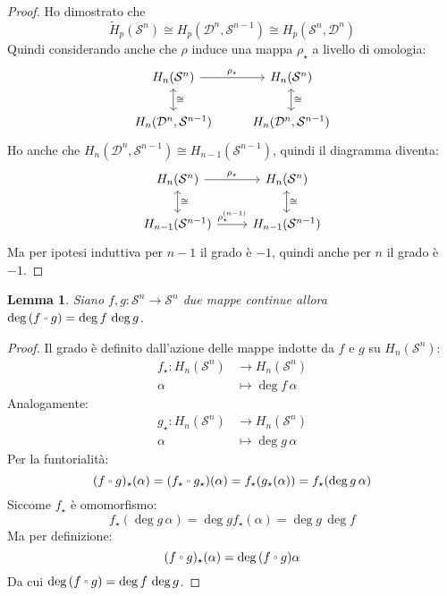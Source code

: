 \documentclass[10pt]{scrartcl}
\newcounter{lemmac}
\newtheorem{lemma}[lemmac]{Lemma}
\newcommand{\Sph}[1][]{\mathcal{S}^#1}
\newcommand{\Disk}[1][]{\mathcal{D}^#1}
\let\latexcirc=\circ
\newcommand{\ccirc}{\mathbin{\mathchoice
  {\xcirc\scriptstyle}
  {\xcirc\scriptstyle}
  {\xcirc\scriptscriptstyle}
  {\xcirc\scriptscriptstyle}
}}
\newcommand{\xcirc}[1]{\vcenter{\hbox{$#1\latexcirc$}}}
\let\circ\ccirc
\begin{document}
\begin{proof}
  Ho dimostrato che
  \[
    \tilde{H}_p(\Sph{n}) \cong H_p(\Disk{n}, \Sph{n-1}) \cong H_p(\Sph{n}, \Disk{n})
  \]
  Quindi considerando anche che $ \rho $ induce una mappa $ \rho_\star $ a livello di omologia:
  \[
    \begin{tikzcd}
      H_n(\Sph{n}) \rar{\rho_\star} \arrow[leftrightarrow]{d}{\cong} & H_n(\Sph{n})  \arrow[leftrightarrow]{d}{\cong} \\
      H_n(\Disk{n}, \Sph{n-1}) &  H_n(\Disk{n}, \Sph{n-1})
    \end{tikzcd}
  \]
  Ho anche che $ H_n(\Disk{n}, \Sph{n-1}) \cong H_{n-1}(\Sph{n-1}) $, quindi il diagramma diventa:
  \[
    \begin{tikzcd}
      H_n(\Sph{n}) \rar{\rho_\star} \arrow[leftrightarrow]{d}{\cong} & H_n(\Sph{n})  \arrow[leftrightarrow]{d}{\cong} \\
      H_{n-1}(\Sph{n-1}) \rar{\rho_\star^{(n-1)}} &  H_{n-1}(\Sph{n-1})
    \end{tikzcd}
  \]
  Ma per ipotesi induttiva per $ n - 1 $ il grado è $ - 1 $, quindi anche per $ n $ il grado è $ - 1 $.
\end{proof}
\begin{lemma}
  \label{lemma:composizione_grado}
  Siano $ f,g \colon \Sph{n} \to \Sph{n} $ due mappe continue allora
  $ \deg {(f \circ g)} = \deg{f} \, \deg{g} $.
\end{lemma}
\begin{proof}
  Il grado è definito dall'azione delle mappe indotte da $ f $ e $ g $
  su $ H_n(\Sph{n}) $:
  \begin{align*}
    f_\star \colon H_n(\Sph{n}) & \to H_n(\Sph{n}) \\
    \alpha & \mapsto \deg f \, \alpha
  \end{align*}
  Analogamente:
  \begin{align*}
    g_\star \colon H_n(\Sph{n}) & \to H_n(\Sph{n}) \\
    \alpha & \mapsto \deg g \, \alpha
  \end{align*}
  Per la funtorialità:
  \[
    (f \circ g)_\star (\alpha) = (f_\star \circ g_\star)(\alpha) = f_\star(g_\star(\alpha)) = f_\star (\deg g \, \alpha)
  \]
  Siccome $ f_\star $ è omomorfismo:
  \[
    f_\star (\deg g \, \alpha) = \deg g f_\star (\alpha) = \deg g \, \deg f
  \]
  Ma per definizione:
  \[
    (f \circ g)_\star (\alpha) = \deg{(f \circ g)} \alpha
  \]
  Da cui $ \deg{(f \circ g)} = \deg f \, \deg g $.
\end{proof}
\end{document}
